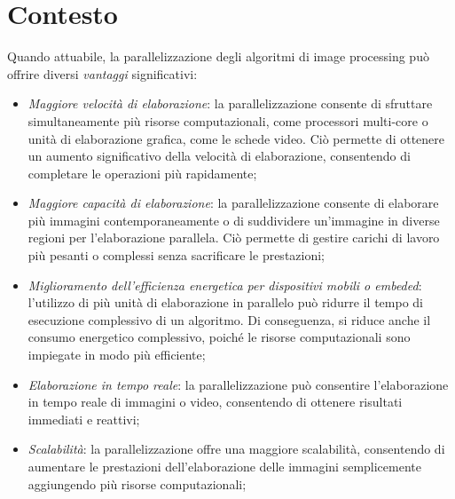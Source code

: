 \chapter{Contesto}
Quando attuabile, la parallelizzazione degli algoritmi di image processing può offrire diversi \textit{vantaggi} significativi:
\begin{itemize}
	\item\textit{Maggiore velocità di elaborazione}: la parallelizzazione consente di sfruttare simultaneamente più risorse computazionali, come processori multi-core o unità di elaborazione grafica, come le schede video. Ciò permette di ottenere un aumento significativo della velocità di elaborazione, consentendo di completare le operazioni più rapidamente;
	\item\textit{Maggiore capacità di elaborazione}: la parallelizzazione consente di elaborare più immagini contemporaneamente o di suddividere un'immagine in diverse regioni per l'elaborazione parallela. Ciò permette di gestire carichi di lavoro più pesanti o complessi senza sacrificare le prestazioni;
	\item \textit{Miglioramento dell'efficienza energetica per dispositivi mobili o embeded}: l'utilizzo di più unità di elaborazione in parallelo può ridurre il tempo di esecuzione complessivo di un algoritmo. Di conseguenza, si riduce anche il consumo energetico complessivo, poiché le risorse computazionali sono impiegate in modo più efficiente;
	\item \textit{Elaborazione in tempo reale}: la parallelizzazione può consentire l'elaborazione in tempo reale di immagini o video, consentendo di ottenere risultati immediati e reattivi;
	\item \textit{Scalabilità}: la parallelizzazione offre una maggiore scalabilità, consentendo di aumentare le prestazioni dell'elaborazione delle immagini semplicemente aggiungendo più risorse computazionali;
\end{itemize}

